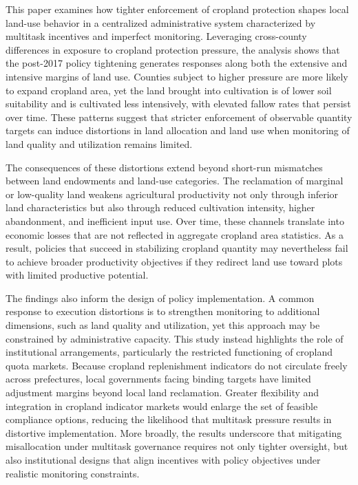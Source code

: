 This paper examines how tighter enforcement of cropland protection shapes local land-use behavior in a centralized administrative system characterized by multitask incentives and imperfect monitoring. Leveraging cross-county differences in exposure to cropland protection pressure, the analysis shows that the post-2017 policy tightening generates responses along both the extensive and intensive margins of land use. Counties subject to higher pressure are more likely to expand cropland area, yet the land brought into cultivation is of lower soil suitability and is cultivated less intensively, with elevated fallow rates that persist over time. These patterns suggest that stricter enforcement of observable quantity targets can induce distortions in land allocation and land use when monitoring of land quality and utilization remains limited.

The consequences of these distortions extend beyond short-run mismatches between land endowments and land-use categories. The reclamation of marginal or low-quality land weakens agricultural productivity not only through inferior land characteristics but also through reduced cultivation intensity, higher abandonment, and inefficient input use. Over time, these channels translate into economic losses that are not reflected in aggregate cropland area statistics. As a result, policies that succeed in stabilizing cropland quantity may nevertheless fail to achieve broader productivity objectives if they redirect land use toward plots with limited productive potential.

The findings also inform the design of policy implementation. A common response to execution distortions is to strengthen monitoring to additional dimensions, such as land quality and utilization, yet this approach may be constrained by administrative capacity. This study instead highlights the role of institutional arrangements, particularly the restricted functioning of cropland quota markets. Because cropland replenishment indicators do not circulate freely across prefectures, local governments facing binding targets have limited adjustment margins beyond local land reclamation. Greater flexibility and integration in cropland indicator markets would enlarge the set of feasible compliance options, reducing the likelihood that multitask pressure results in distortive implementation. More broadly, the results underscore that mitigating misallocation under multitask governance requires not only tighter oversight, but also institutional designs that align incentives with policy objectives under realistic monitoring constraints.
